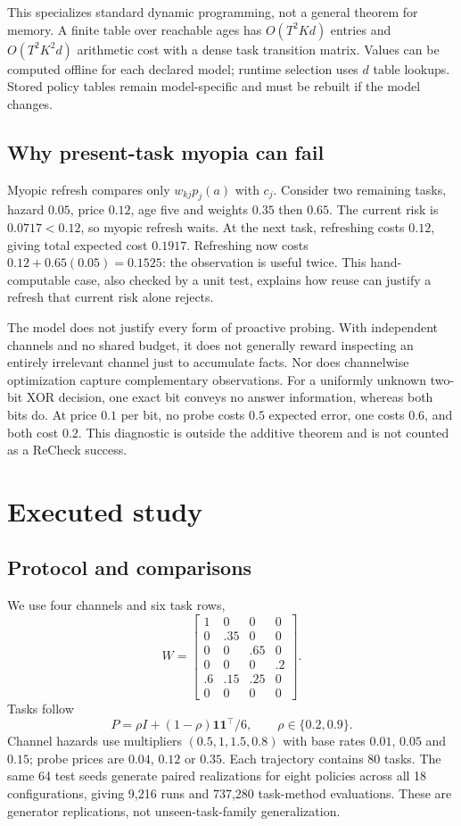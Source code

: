 \documentclass[10pt,letterpaper]{article}
\begin{document}
This specializes standard dynamic programming, not a general theorem for memory. A finite table over reachable ages has $O(T^2Kd)$ entries and $O(T^2K^2d)$ arithmetic cost with a dense task transition matrix. Values can be computed offline for each declared model; runtime selection uses $d$ table lookups. Stored policy tables remain model-specific and must be rebuilt if the model changes.

\subsection{Why present-task myopia can fail}
Myopic refresh compares only $w_{kj}p_j(a)$ with $c_j$. Consider two remaining tasks, hazard $0.05$, price $0.12$, age five and weights $0.35$ then $0.65$. The current risk is $0.0717<0.12$, so myopic refresh waits. At the next task, refreshing costs $0.12$, giving total expected cost $0.1917$. Refreshing now costs $0.12+0.65(0.05)=0.1525$: the observation is useful twice. This hand-computable case, also checked by a unit test, explains how reuse can justify a refresh that current risk alone rejects.

The model does not justify every form of proactive probing. With independent channels and no shared budget, it does not generally reward inspecting an entirely irrelevant channel just to accumulate facts. Nor does channelwise optimization capture complementary observations. For a uniformly unknown two-bit XOR decision, one exact bit conveys no answer information, whereas both bits do. At price $0.1$ per bit, no probe costs $0.5$ expected error, one costs $0.6$, and both cost $0.2$. This diagnostic is outside the additive theorem and is not counted as a ReCheck success.

\section{Executed study}
\subsection{Protocol and comparisons}
We use four channels and six task rows,
\begin{equation}
 W=\begin{bmatrix}
1&0&0&0\\0&.35&0&0\\0&0&.65&0\\0&0&0&.2\\
.6&.15&.25&0\\0&0&0&0
\end{bmatrix}.
\end{equation}
Tasks follow
\begin{equation}
 P=\rho I+(1-\rho)\mathbf{1}\mathbf{1}^{\top}/6,\qquad \rho\in\{0.2,0.9\}.
\end{equation} Channel hazards use multipliers $(0.5,1,1.5,0.8)$ with base rates $0.01$, $0.05$ and $0.15$; probe prices are $0.04$, $0.12$ or $0.35$. Each trajectory contains 80 tasks. The same 64 test seeds generate paired realizations for eight policies across all 18 configurations, giving 9,216 runs and 737,280 task-method evaluations. These are generator replications, not unseen-task-family generalization.
\end{document}
